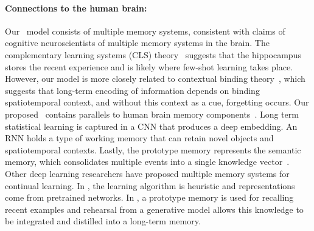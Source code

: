 \vspace{-0.1in}
\paragraph{Connections to the human brain:}
Our \ourmodelshort\ model consists of multiple memory systems, consistent with claims of cognitive
neuroscientists of multiple memory systems in the brain. The  complementary learning systems (CLS)
theory~\citep{cls} suggests that the hippocampus stores the recent experience and is likely where
few-shot learning takes place. However, our model is more closely related to contextual binding
theory~\citep{ctxbinding}, which suggests that long-term encoding of information depends on binding
spatiotemporal context, and without this context as a cue, forgetting occurs. Our proposed
\ourmodelshort\ contains parallels to human brain memory components~\citep{cohensquire}. Long term
statistical learning is captured in a CNN that produces a deep embedding. An RNN holds a type of
working memory that can retain novel objects and spatiotemporal contexts. Lastly, the prototype
memory represents the semantic memory, which consolidates multiple events into a single knowledge
vector~\citep{semanticmem}. Other deep learning researchers have proposed multiple memory
systems for continual learning. In \citet{dualmem}, the learning algorithm is heuristic and
representations come from pretrained networks. In \citet{fearnet}, a prototype memory is used for
recalling recent examples and rehearsal from a generative model allows this knowledge to be
integrated and distilled into a long-term memory.